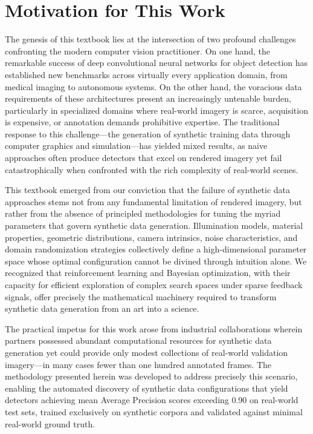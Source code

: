 \section*{Motivation for This Work}

The genesis of this textbook lies at the intersection of two profound challenges confronting the modern computer vision practitioner. On one hand, the remarkable success of deep convolutional neural networks for object detection has established new benchmarks across virtually every application domain, from medical imaging to autonomous systems. On the other hand, the voracious data requirements of these architectures present an increasingly untenable burden, particularly in specialized domains where real-world imagery is scarce, acquisition is expensive, or annotation demands prohibitive expertise. The traditional response to this challenge---the generation of synthetic training data through computer graphics and simulation---has yielded mixed results, as naive approaches often produce detectors that excel on rendered imagery yet fail catastrophically when confronted with the rich complexity of real-world scenes.

This textbook emerged from our conviction that the failure of synthetic data approaches stems not from any fundamental limitation of rendered imagery, but rather from the absence of principled methodologies for tuning the myriad parameters that govern synthetic data generation. Illumination models, material properties, geometric distributions, camera intrinsics, noise characteristics, and domain randomization strategies collectively define a high-dimensional parameter space whose optimal configuration cannot be divined through intuition alone. We recognized that reinforcement learning and Bayesian optimization, with their capacity for efficient exploration of complex search spaces under sparse feedback signals, offer precisely the mathematical machinery required to transform synthetic data generation from an art into a science.

The practical impetus for this work arose from industrial collaborations wherein partners possessed abundant computational resources for synthetic data generation yet could provide only modest collections of real-world validation imagery---in many cases fewer than one hundred annotated frames. The methodology presented herein was developed to address precisely this scenario, enabling the automated discovery of synthetic data configurations that yield detectors achieving mean Average Precision scores exceeding 0.90 on real-world test sets, trained exclusively on synthetic corpora and validated against minimal real-world ground truth.

